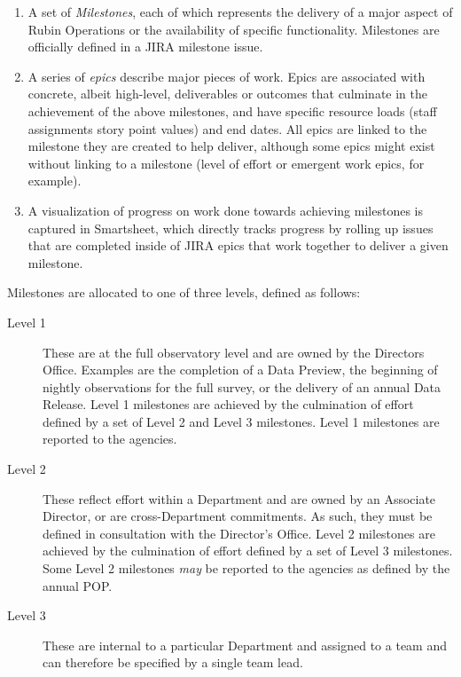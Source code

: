 \begin{enumerate}
    \item
        A set of \emph{Milestones}, each of which represents the delivery of a major aspect of Rubin Operations or the availability of specific functionality. 
        Milestones are officially defined in a \gls{JIRA} milestone issue.
    \item
        A series of \emph{epics} describe major pieces of work. 
        Epics are associated with concrete, albeit high-level, deliverables or outcomes that culminate in the achievement of the above milestones, and have specific resource loads (staff assignments story point values) and end dates. 
        All epics are linked to the milestone they are created to help deliver, although some epics might exist without linking to a milestone (level of effort or emergent work epics, for example).  
    \item
        A visualization of progress on work done towards achieving milestones is captured in Smartsheet, which directly tracks progress by rolling up issues that are completed inside of \gls{JIRA} epics that work together to deliver a given milestone.      
\end{enumerate}

Milestones are allocated to one of three levels, defined as follows:

\begin{description}
\item[Level 1]
These are at the full observatory level and are owned by the Directors Office. 
Examples are the completion of a Data Preview, the beginning of nightly observations for the full survey, or the delivery of an annual Data Release. 
Level 1 milestones are achieved by the culmination of effort defined by a set of Level 2 and Level 3 milestones. 
Level 1 milestones are reported to the agencies.
\item[Level 2]
These reflect effort within a Department and are owned by an Associate Director, or are cross-Department commitments. 
As such, they must be defined in consultation with the Director's Office.
Level 2 milestones are achieved by the culmination of effort defined by a set of Level 3 milestones.
Some Level 2 milestones {\it may} be reported to the agencies as defined by the annual POP. 
\item[Level 3]
These are internal to a particular Department and assigned to a team and can therefore be specified by a single team lead.
\end{description}

